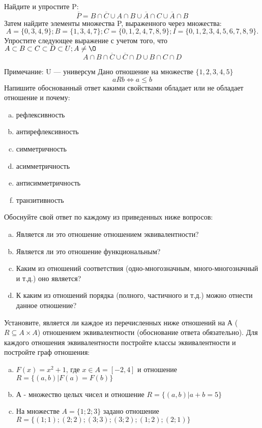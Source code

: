 \documentclass[10pt]{exam}
\begin{document}
\begin{questions}
\question
Найдите и упростите P:
\begin{equation*}
\overline{P} = B \cap \overline{C} \cup A \cap B \cup \overline{A} \cap C \cup \overline{A} \cap B
\end{equation*}
Затем найдите элементы множества P, выраженного через множества:
\begin{equation*}
A = \{0, 3, 4, 9\}; 
B = \{1, 3, 4, 7\};
C = \{0, 1, 2, 4, 7, 8, 9\};
I = \{0, 1, 2, 3, 4, 5, 6, 7, 8, 9\}.
\end{equation*}\question
Упростите следующее выражение с учетом того, что $A\subset B \subset C \subset D \subset U; A \neq \O$
\begin{equation*}
A \cap B  \cap \overline{C} \cup \overline{C} \cap D \cup B \cap C \cap D
\end{equation*}

Примечание: U — универсум\question
Дано отношение на множестве $\{1, 2, 3, 4, 5\}$ 
\begin{equation*}
aRb \iff a \leq b
\end{equation*}
Напишите обоснованный ответ какими свойствами обладает или не обладает отношение и почему:   
\begin{enumerate} [a)]\setcounter{enumi}{0}
\item рефлексивность
\item антирефлексивность
\item симметричность
\item асимметричность
\item антисимметричность
\item транзитивность
\end{enumerate}

Обоснуйте свой ответ по каждому из приведенных ниже вопросов:
\begin{enumerate} [a)]\setcounter{enumi}{0}
    \item Является ли это отношение отношением эквивалентности?
    \item Является ли это отношение функциональным?
    \item Каким из отношений соответствия (одно-многозначным, много-многозначный и т.д.) оно является?
    \item К каким из отношений порядка (полного, частичного и т.д.) можно отнести данное отношение?
\end{enumerate}


\question
Установите, является ли каждое из перечисленных ниже отношений на А ($R \subseteq A \times A$) отношением эквивалентности (обоснование ответа обязательно). Для каждого отношения эквивалентности постройте классы эквивалентности и постройте граф отношения:
\begin{enumerate} [a)]\setcounter{enumi}{0}
\item $F(x)=x^{2}+1$, где $x \in A = [-2, 4]$ и отношение $R = \{(a,b)|F(a) = F(b)\}$
\item А - множество целых чисел и отношение $R = \{(a,b)|a + b = 5\}$
\item На множестве $A = \{1; 2; 3\}$ задано отношение $R = \{(1; 1); (2; 2); (3; 3); (3; 2); (1; 2); (2; 1)\}$


\end{enumerate}
\end{questions}
\end{document}

